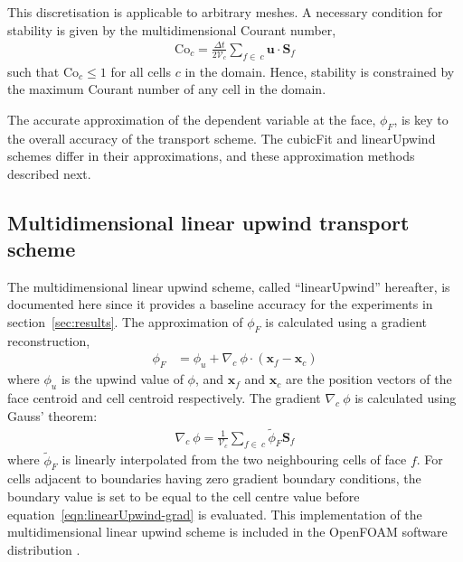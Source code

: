 This discretisation is applicable to arbitrary meshes.  A necessary condition for stability is given by the multidimensional Courant number,
\begin{align}
	\mathrm{Co}_c = \frac{\Delta t}{2 \mathcal{V}_c} \sum_{f \in\: c} \mathbf{u} \cdot \mathbf{S}_f
\end{align}
such that $\mathrm{Co}_c \leq 1$ for all cells $c$ in the domain.  Hence, stability is constrained by the maximum Courant number of any cell in the domain.

The accurate approximation of the dependent variable at the face, $\phi_F$, is key to the overall accuracy of the transport scheme. The cubicFit and linearUpwind schemes differ in their approximations, and these approximation methods described next.




\subsection{Multidimensional linear upwind transport scheme}
The multidimensional linear upwind scheme, called ``linearUpwind'' hereafter, is documented here since it provides a baseline accuracy for the experiments in section~\ref{sec:results}.  The approximation of $\phi_F$ is calculated using a gradient reconstruction,
\begin{align}
	\phi_F &= \phi_u + \nabla_c\: \phi \cdot \left(\mathbf{x}_f - \mathbf{x}_c \right)
\end{align} 
where $\phi_u$ is the upwind value of $\phi$, and $\mathbf{x}_f$ and $\mathbf{x}_c$ are the position vectors of the face centroid and cell centroid respectively.
The gradient $\nabla_c \:\phi$ is calculated using Gauss' theorem:
\begin{align}
	\nabla_c\: \phi = \frac{1}{\mathcal{V}_c} \sum_{f\in\:c} \widetilde{\phi}_F \mathbf{S}_f \label{eqn:linearUpwind-grad}
\end{align}
where $\widetilde{\phi}_F$ is linearly interpolated from the two neighbouring cells of face $f$.  For cells adjacent to boundaries having zero gradient boundary conditions, the boundary value is set to be equal to the cell centre value before equation~\eqref{eqn:linearUpwind-grad} is evaluated.
This implementation of the multidimensional linear upwind scheme is included in the OpenFOAM software distribution \citep{openfoam}.

